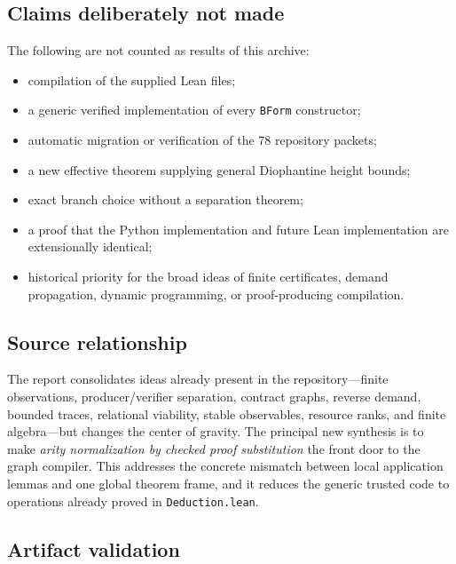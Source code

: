\subsection{Claims deliberately not made}

The following are not counted as results of this archive:
\begin{itemize}
  \item compilation of the supplied Lean files;
  \item a generic verified implementation of every \texttt{BForm} constructor;
  \item automatic migration or verification of the 78 repository packets;
  \item a new effective theorem supplying general Diophantine height bounds;
  \item exact branch choice without a separation theorem;
  \item a proof that the Python implementation and future Lean implementation are extensionally identical;
  \item historical priority for the broad ideas of finite certificates, demand propagation, dynamic
        programming, or proof-producing compilation.
\end{itemize}

\subsection{Source relationship}

The report consolidates ideas already present in the repository---finite observations, producer/verifier
separation, contract graphs, reverse demand, bounded traces, relational viability, stable observables,
resource ranks, and finite algebra---but changes the center of gravity.  The principal new synthesis is to
make \emph{arity normalization by checked proof substitution} the front door to the graph compiler.  This
addresses the concrete mismatch between local application lemmas and one global theorem frame, and it
reduces the generic trusted code to operations already proved in \texttt{Deduction.lean}.

\subsection{Artifact validation}

